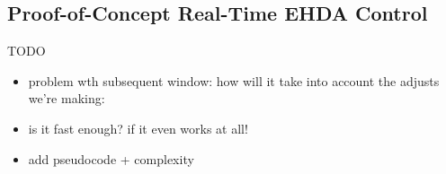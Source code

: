 \documentclass[oneside,12pt]{article}
\begin{document}
\subsection{Proof-of-Concept Real-Time EHDA Control}
TODO

\begin{itemize}
    \item problem wth subsequent window: how will it take into account the adjusts we're making:
    \item is it fast enough? if it even works at all!
    \item add pseudocode + complexity
\end{itemize}

\newpage    \pagestyle{plain}

\end{document}
